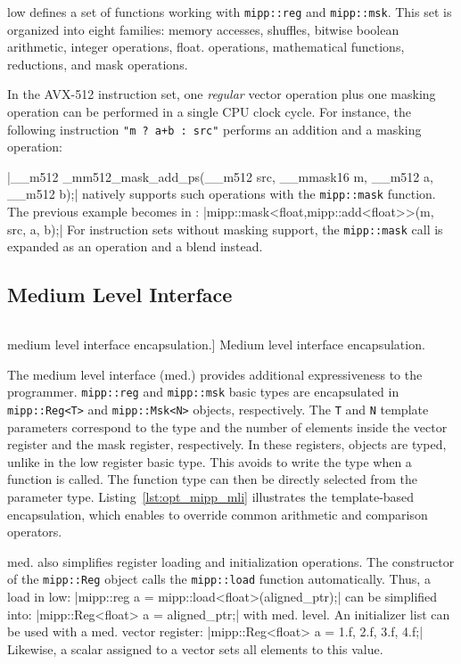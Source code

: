 \MIPP low defines a set of functions working with \verb|mipp::reg| and
\verb|mipp::msk|. This set is organized into eight families: memory accesses,
shuffles, bitwise boolean arithmetic, integer operations, float. operations,
mathematical functions, reductions, and mask operations.

In the AVX-512 instruction set, one \textit{regular} vector operation plus one
masking operation can be performed in a single CPU clock cycle. For instance,
the following instruction \verb|"m ? a+b : src"| performs an addition and a
masking operation:

|__m512 _mm512_mask_add_ps(__m512 src, __mmask16 m, __m512 a, __m512 b);|
{\noindent
\MIPP natively supports such operations with the \verb|mipp::mask| function. The
previous example becomes in \MIPP:
}
|mipp::mask<float,mipp::add<float>>(m, src, a, b);|
{\noindent
For instruction sets without masking support, the \verb|mipp::mask| call is
expanded as an operation and a blend instead.
}
\subsection{Medium Level Interface}

\begin{listing}[htp]
  \inputminted[frame=lines,linenos]{C++}{\curChapter/src/mipp/mli.cpp}
  \caption
    [\MIPP medium level interface encapsulation.]
    {Medium level interface encapsulation.}
  \label{lst:opt_mipp_mli}
\end{listing}

The \MIPP medium level interface (\MIPP med.) provides additional expressiveness
to the programmer. \verb|mipp::reg| and \verb|mipp::msk| basic types are
encapsulated in \verb|mipp::Reg<T>| and \verb|mipp::Msk<N>| objects,
respectively. The \verb|T| and \verb|N| template parameters correspond to the
type and the number of elements inside the vector register and the mask
register, respectively. In these registers, objects are typed, unlike in the
\MIPP low register basic type. This avoids to write the type when a \MIPP
function is called. The function type can then be directly selected from the
parameter type. Listing~\ref{lst:opt_mipp_mli} illustrates the template-based
encapsulation, which enables \MIPP to override common arithmetic and comparison
operators.

\MIPP med. also simplifies register loading and initialization operations. The
constructor of the \verb|mipp::Reg| object calls the \verb|mipp::load| function
automatically. Thus, a load in \MIPP low:
|mipp::reg a = mipp::load<float>(aligned_ptr);|
{\noindent
can be simplified into:
}
|mipp::Reg<float> a = aligned_ptr;|
{\noindent
with \MIPP med. level. An initializer list
can be used with a \MIPP med. vector register:
}
|mipp::Reg<float> a = {1.f, 2.f, 3.f, 4.f};|
{\noindent
Likewise, a scalar assigned to a vector sets all elements to this value.
}

